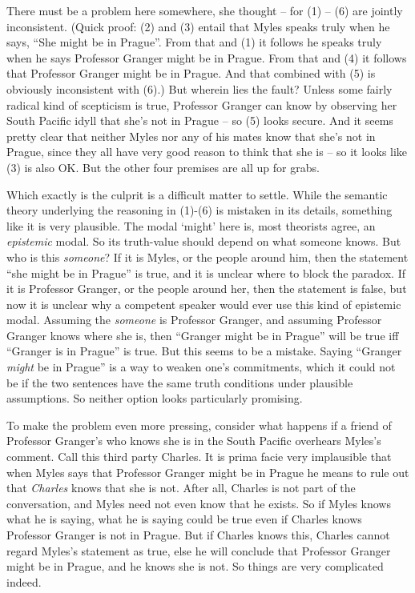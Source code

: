 \documentclass[
  11pt,
  letterpaper,
  DIV=11,
  numbers=noendperiod]{scrartcl}
\begin{document}
There must be a problem here somewhere, she thought -- for (1) -- (6)
are jointly inconsistent. (Quick proof: (2) and (3) entail that Myles
speaks truly when he says, ``She might be in Prague''. From that and (1)
it follows he speaks truly when he says Professor Granger might be in
Prague. From that and (4) it follows that Professor Granger might be in
Prague. And that combined with (5) is obviously inconsistent with (6).)
But wherein lies the fault? Unless some fairly radical kind of
scepticism is true, Professor Granger can know by observing her South
Pacific idyll that she's not in Prague -- so (5) looks secure. And it
seems pretty clear that neither Myles nor any of his mates know that
she's not in Prague, since they all have very good reason to think that
she is -- so it looks like (3) is also OK. But the other four premises
are all up for grabs.

Which exactly is the culprit is a difficult matter to settle. While the
semantic theory underlying the reasoning in (1)-(6) is mistaken in its
details, something like it is very plausible. The modal `might' here is,
most theorists agree, an \emph{epistemic} modal. So its truth-value
should depend on what someone knows. But who is this \emph{someone}? If
it is Myles, or the people around him, then the statement ``she might be
in Prague'' is true, and it is unclear where to block the paradox. If it
is Professor Granger, or the people around her, then the statement is
false, but now it is unclear why a competent speaker would ever use this
kind of epistemic modal. Assuming the \emph{someone} is Professor
Granger, and assuming Professor Granger knows where she is, then
``Granger might be in Prague'' will be true iff ``Granger is in Prague''
is true. But this seems to be a mistake. Saying ``Granger \emph{might}
be in Prague'' is a way to weaken one's commitments, which it could not
be if the two sentences have the same truth conditions under plausible
assumptions. So neither option looks particularly promising.

To make the problem even more pressing, consider what happens if a
friend of Professor Granger's who knows she is in the South Pacific
overhears Myles's comment. Call this third party Charles. It is prima
facie very implausible that when Myles says that Professor Granger might
be in Prague he means to rule out that \emph{Charles} knows that she is
not. After all, Charles is not part of the conversation, and Myles need
not even know that he exists. So if Myles knows what he is saying, what
he is saying could be true even if Charles knows Professor Granger is
not in Prague. But if Charles knows this, Charles cannot regard Myles's
statement as true, else he will conclude that Professor Granger might be
in Prague, and he knows she is not. So things are very complicated
indeed.
\end{document}
